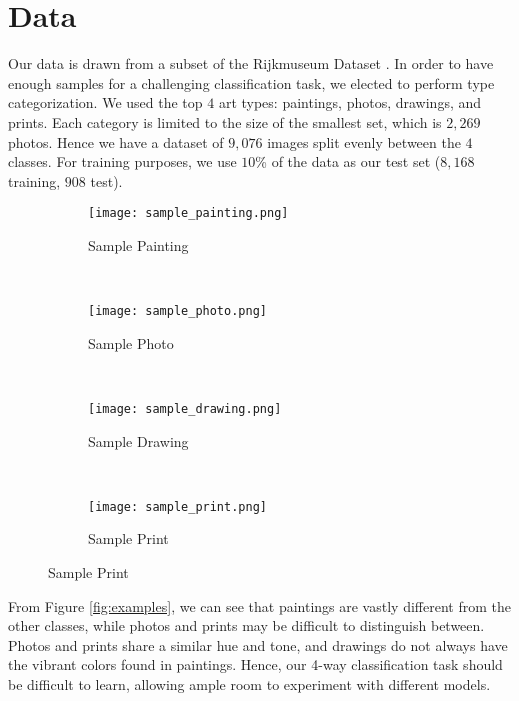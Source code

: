 \documentclass{article}
\begin{document}
\section{Data}
\label{sec:data}
Our data is drawn from a subset of the Rijkmuseum Dataset \cite{Rijksmuseum}.
In order to have enough samples for a challenging classification task, we
elected to perform type categorization. We used the top $4$ art types: paintings,
photos, drawings, and prints. Each category is limited to the size of the
smallest set, which is $2,269$ photos. Hence we have a dataset of $9,076$ images
split evenly between the $4$ classes. For training purposes, we use $10$\% of the
data as our test set ($8,168$ training, $908$ test).

 \begin{figure}[h!]
   \caption{Class Examples}
   \vspace{-5pt}
   \label{fig:examples}
   \begin{subfigure}[b]{0.23\textwidth}
     \centering
     \texttt{[image: sample\_painting.png]}
     \caption{Sample Painting}
     \label{fig:painting}
   \end{subfigure}
   ~
   \begin{subfigure}[b]{0.23\textwidth}
     \centering
     \texttt{[image: sample\_photo.png]}
     \caption{Sample Photo}
     \label{fig:photo}
   \end{subfigure}
   ~
   \begin{subfigure}[b]{0.23\textwidth}
     \centering
     \texttt{[image: sample\_drawing.png]}
     \caption{Sample Drawing}
     \label{fig:drawing}
   \end{subfigure}
   ~
   \begin{subfigure}[b]{0.23\textwidth}
     \centering
     \texttt{[image: sample\_print.png]}
     \caption{Sample Print}
     \label{fig:print}
   \end{subfigure}
 \end{figure}

From Figure \ref{fig:examples}, we can see that paintings are vastly different
from the other classes, while photos and prints may be difficult to distinguish
between. Photos and prints share a similar hue and tone, and drawings do not
always have the vibrant colors found in paintings. Hence, our 4-way
classification task should be difficult to learn, allowing ample room to
experiment with different models.


\end{document}
